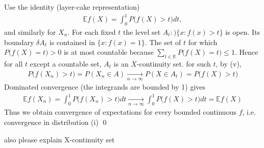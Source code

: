 \documentclass[10pt]{article}
\begin{document}
\begin{enumerate}[label=\textit{(\roman*)}]
    Use the identity (layer-cake representation)
    \begin{gather*}
        \mathbb{E}f(X) = \int_{0}^{1}P\big(f(X) > t\big) dt,
    \end{gather*}
    and similarly for $X_n$. For each fixed $t$ the level set $A_t :) \{x : f(x) > t\}$ is open. Its boundary $\delta A_t$ is contained in $\{x : f(x) = 1\}$. The set of $t$ for which $P\big(f(X) = t\big) > 0$ is at most countable because $\sum_{t\in \mathbb{R}}P\big(f(X) = t \big) \leq 1$. Hence for all $t$ except a countable set, $A_t$ is an $X$-continuity set. for such $t$, by (v),
    \begin{gather*}
        P\big(f(X_n) > t \big) = P(X_n \in A) \xrightarrow[n \to \infty]{} P(X \in A_t) = P\big(f(X) > t \big)
    \end{gather*}
    Dominated convergence (the integrands are bounded by 1) gives 
    \begin{gather*}
        \mathbb{E}f(X_n) = \int_{0}^{1}P\big(f(X_n) > t \big) dt \xrightarrow[n\to\infty]{}\int_{0}^{1}P\big(f(X) > t \big) dt = \mathbb{E}f(X)
    \end{gather*}
    Thus we obtain convergence of expectations for every bounded continuous $f$, i.e. convergence in distribution (i) \qed
\end{enumerate}

also please explain X-continuity set
\end{document}
